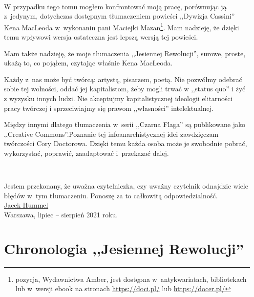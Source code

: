 \documentclass[oneside,polish,11pt,sfheadings]{mwbk}
\begin{document}
~

W przypadku tego tomu mogłem konfrontować moją pracę, porównując ją z~jedynym, dotychczas dostępnym tłumaczeniem powieści ,,Dywizja Cassini'' Kena MacLeoda w~wykonaniu pani Maciejki Mazan\footnote{pozycja, Wydawnictwa Amber, jest dostępna w~antykwariatach, bibliotekach lub w~wersji ebook na stronach \url{https://doci.pl/} lub \url{https://docer.pl/}}. Mam nadzieję, że dzięki temu wpływowi wersja ostateczna jest lepszą wersją tej powieści.

Mam także nadzieję, że moje tłumaczenia ,,Jesiennej Rewolucji'', surowe, proste, ukażą to, co pojąłem, czytając właśnie Kena MacLeoda. 

Każdy z~nas może być twórcą: artystą, pisarzem, poetą. Nie pozwólmy odebrać sobie tej wolności, oddać jej kapitalistom, żeby mogli trwać w ,,status quo''  i żyć z wyzysku innych ludzi. Nie akceptujmy kapitalistycznej ideologii elitarności pracy twórczej i sprzeciwiajmy się prawom ,,własności'' intelektualnej.

Między innymi dlatego tłumaczenia w~serii ,,Czarna Flaga'' są publikowane jako ,,Creative Commons''.Poznanie tej infoanarchistycznej idei zawdzięczam twórczości Cory Doctorowa. Dzięki temu każda osoba może je swobodnie pobrać, wykorzystać, poprawić, zaadaptować i~przekazać dalej.

~

Jestem przekonany, że uważna czytelniczka, czy uważny czytelnik odnajdzie wiele błędów w~tym tłumaczeniu. Ponoszę za to całkowitą odpowiedzialność.\\

\href{mailto:theskymyladythesky@zoho.eu}{Jacek Hummel}\\

Warszawa, lipiec -- sierpień 2021 roku.

\chapter*{Chronologia ,,Jesiennej Rewolucji''}
\end{document}
